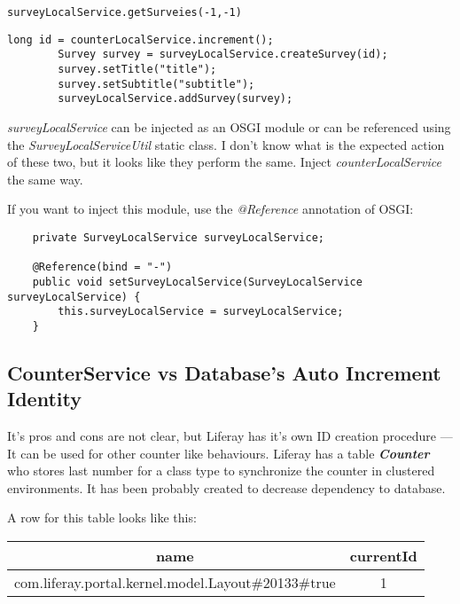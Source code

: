 \lstset{language=java}
\begin{minipage}{\linewidth}
\begin{lstlisting}[caption=Find]
surveyLocalService.getSurveies(-1,-1)
\end{lstlisting}
\end{minipage}

\lstset{language=java}
\begin{minipage}{\linewidth}
\begin{lstlisting}[caption=Insert]
        long id = counterLocalService.increment();
        Survey survey = surveyLocalService.createSurvey(id);
        survey.setTitle("title");
        survey.setSubtitle("subtitle");
        surveyLocalService.addSurvey(survey);
\end{lstlisting}
\end{minipage}

\textit{surveyLocalService} can be injected as an OSGI module or can be referenced using the \textit{SurveyLocalServiceUtil} static class. I don't know what is the expected action of these two, but it looks like they perform the same.
Inject \textit{counterLocalService} the same way.

If you want to inject this module, use the \textit{@Reference} annotation of OSGI:

\lstset{language=java}
\begin{minipage}{\linewidth}
\begin{lstlisting}
    private SurveyLocalService surveyLocalService;

    @Reference(bind = "-")
    public void setSurveyLocalService(SurveyLocalService surveyLocalService) {
        this.surveyLocalService = surveyLocalService;
    }
\end{lstlisting}
\end{minipage}


\subsection{CounterService vs Database's Auto Increment Identity}

It's pros and cons are not clear, but Liferay has it's own ID creation procedure --- It can be used for other counter like behaviours. Liferay has a table \textit{\textbf{Counter}} who stores last number for a class type to synchronize the counter in clustered environments. It has been probably created to decrease dependency to database.

A row for this table looks like this:

\begin{center}
    \begin{tabular}{|c|c|}
        \hline
        name & currentId \\
        \hline \hline
        com.liferay.portal.kernel.model.Layout\#20133\#true & 1 \\
        \hline
    \end{tabular}
\end{center}
